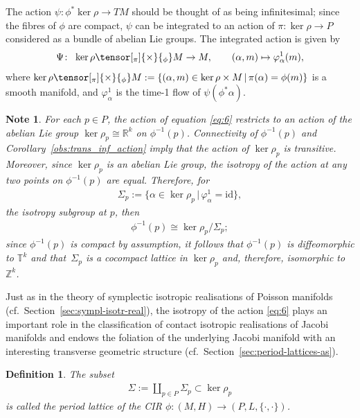 \documentclass[pdftex]{sigma}
\numberwithin{equation}{section}
\newtheorem{Definition}[Theorem]{Definition}
\newtheorem{Note}[Theorem]{Note}
\newcommand{\JM}{(P,L,\{\cdot,\cdot\})} %
\newcommand{\CM}{(M,H)} %
\newcommand{\RR}{\mathbb{R}}
\newcommand{\ZZ}{\mathbb{Z}}
\begin{document}
The action $\psi \colon \phi^* \ker \rho \to T M$ should be thought of as being inf\/initesimal; since the f\/ibres of $\phi$ are compact, $\psi$ can be integrated to an action of $\pi \colon \ker \rho \to P$ considered as a bundle of abelian Lie groups. The integrated action is given by
\begin{gather}\label{eq:6}
 \Psi \colon \ \ker \rho \tensor[_\pi]{\times}{_{\phi}} M\to M, \qquad (\alpha,m) \mapsto \varphi^1_{\alpha}(m),
\end{gather}
where $ \ker \rho \tensor[_\pi]{\times}{_{\phi}} M :=\{ (\alpha,m) \in \ker \rho \times M \,|\,\pi(\alpha) = \phi(m) \}$ is a smooth manifold, and $\varphi^1_{\alpha}$ is the time-1 f\/low of $\psi(\phi^*\alpha)$.

\begin{Note}\label{obs:per_lattice} For each $p \in P$, the action of equation \eqref{eq:6} restricts to an action of the abelian Lie group $\ker \rho_{p} \cong \RR^k$ on $\phi^{-1}(p)$. Connectivity of $\phi^{-1}(p)$ and Corollary~\ref{obs:trans_inf_action} imply that the action of $\ker \rho_{p}$ is transitive. Moreover, since $\ker \rho_{p}$ is an abelian Lie group, the isotropy of the action at any two points on $\phi^{-1}(p)$ are equal. Therefore, for
\begin{gather*}
 \Sigma_p := \big\{ \alpha\in \ker \rho_{p} \,|\, \varphi^1_{\alpha} = \mathrm{id} \big\},
\end{gather*}
the isotropy subgroup at $p$, then
\begin{gather*}
 \phi^{-1}(p) \cong \ker \rho_{p}/\Sigma_p;
\end{gather*}
since $\phi^{-1}(p)$ is compact by assumption, it follows that $\phi^{-1}(p)$ is dif\/feomorphic to $\mathbb{T}^k$ and that~$\Sigma_p$ is a cocompact lattice in $\ker \rho_{p}$ and, therefore, isomorphic to $\ZZ^k$.
\end{Note}

Just as in the theory of symplectic isotropic realisations of Poisson manifolds (cf.\ Section~\ref{sec:sympl-isotr-real}), the isotropy of the action \eqref{eq:6} plays an important role in the classif\/ication of contact isotropic realisations of Jacobi manifolds and endows the foliation of the underlying Jacobi manifold with an interesting transverse geometric structure (cf.\ Section~\ref{sec:period-lattices-as}).

\begin{Definition}\label{defn:period_lattice} The subset
 \begin{gather*}
 \Sigma := \coprod\limits_{p \in P} \Sigma_p \subset \ker \rho_{p}
 \end{gather*}
is called the {\it period lattice} of the CIR $\phi \colon \CM \to \JM$.
\end{Definition}
\end{document}
